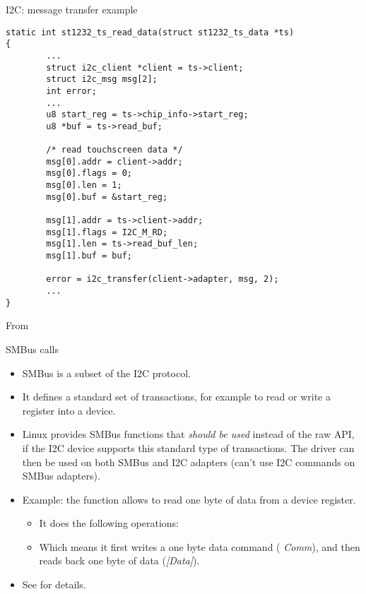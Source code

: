 \begin{frame}[fragile]{I2C: message transfer example}
\begin{block}{}
  \begin{verbatim}
static int st1232_ts_read_data(struct st1232_ts_data *ts)
{
        ...
        struct i2c_client *client = ts->client;
        struct i2c_msg msg[2];
        int error;
        ...
        u8 start_reg = ts->chip_info->start_reg;
        u8 *buf = ts->read_buf;

        /* read touchscreen data */
        msg[0].addr = client->addr;
        msg[0].flags = 0;
        msg[0].len = 1;
        msg[0].buf = &start_reg;

        msg[1].addr = ts->client->addr;
        msg[1].flags = I2C_M_RD;
        msg[1].len = ts->read_buf_len;
        msg[1].buf = buf;

        error = i2c_transfer(client->adapter, msg, 2);
        ...
}
\end{verbatim}
\end{block}
From 
\end{frame}

\begin{frame}{SMBus calls}
  \begin{itemize}
  \item SMBus is a subset of the I2C protocol.
  \item It defines a standard set of transactions, for example to read
    or write a register into a device.
  \item Linux provides SMBus functions that {\em should be used}
    instead of the raw API, if the I2C device supports this
    standard type of transactions. The driver can then be used on both
    SMBus and I2C adapters (can't use I2C commands on SMBus adapters).
  \item Example: the  function allows
    to read one byte of data from a device register.
    \begin{itemize}
    \item It does the following operations:
    \item Which means it first writes a one byte data command ({\em
        Comm}), and then reads back one byte of data ({\em [Data]}).
    \end{itemize}
  \item See  for details.
  \end{itemize}
\end{frame}

